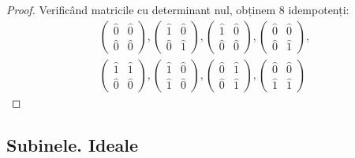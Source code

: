\begin{exercise}[1.29]
\begin{itemize}
\begin{proof}
    Verificând matricile cu determinant nul, obținem 8 idempotenți:
    \begin{gather*}
        \begin{pmatrix}
            \widehat{0} & \widehat{0} \\
            \widehat{0} & \widehat{0}
        \end{pmatrix},
        \begin{pmatrix}
            \widehat{1} & \widehat{0} \\
            \widehat{0} & \widehat{1}
        \end{pmatrix},
        \begin{pmatrix}
            \widehat{1} & \widehat{0} \\
            \widehat{0} & \widehat{0}
        \end{pmatrix},
        \begin{pmatrix}
            \widehat{0} & \widehat{0} \\
            \widehat{0} & \widehat{1}
        \end{pmatrix},
        \\
        \begin{pmatrix}
            \widehat{1} & \widehat{1} \\
            \widehat{0} & \widehat{0}
        \end{pmatrix},
        \begin{pmatrix}
            \widehat{1} & \widehat{0} \\
            \widehat{1} & \widehat{0}
        \end{pmatrix},
        \begin{pmatrix}
            \widehat{0} & \widehat{1} \\
            \widehat{0} & \widehat{1}
        \end{pmatrix},
        \begin{pmatrix}
            \widehat{0} & \widehat{0} \\
            \widehat{1} & \widehat{1}
        \end{pmatrix}
    \end{gather*}
    \end{proof}
\end{itemize}
\end{exercise}

\subsection{Subinele. Ideale}


